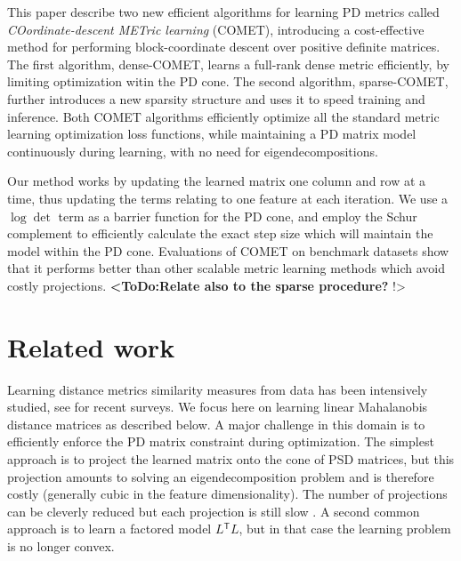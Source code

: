 \documentclass[twoside,11pt]{article}
\newcommand\todo[1]{\textbf{<ToDo:#1}!>}
\newcommand\mat[1]{{#1}}
\newcommand{\T}{{}^\mathsf{T}}
\newcommand{\ignore}[1]{}
\newcommand{\cholL}{\mat{L}}
\begin{document}
This paper describe two new efficient algorithms for learning PD metrics called {\em{COordinate-descent METric learning}} (COMET), introducing a cost-effective method for performing block-coordinate descent over positive definite matrices. The first algorithm, dense-COMET, learns a full-rank dense metric efficiently, by limiting optimization witin the PD cone. The second algorithm, sparse-COMET, further introduces a new sparsity structure and uses it to speed training and inference. Both COMET algorithms  efficiently optimize all the standard metric learning optimization loss functions, while maintaining a PD matrix model continuously during learning, with no need for eigendecompositions. 

Our method works by updating the learned matrix one column and row at a time, thus updating the terms relating to one feature at each iteration. We use a $\log \det$ term as a barrier function for the PD cone, and employ the Schur complement to efficiently calculate the exact step size which will maintain the model within the PD cone. Evaluations of COMET on benchmark datasets show that it performs better than other scalable metric learning methods which avoid costly projections. \todo{Relate also to the sparse procedure? }

\ignore{Furthermore an important challenge for metric learning is the case where the set of features is not fixed in advance, but changes with time. This is a typical scenario in many real life applications of learning: as more data accumulates, it is possible to estimate more parameters accurately, so more features and signals are gradually added to existing systems. It is therefore desirable to develop algorithms that can learn metrics in face of a growing feature set. Our method naturally adapts to this setting, by optimizing the metric matrix one column-row at a time.}

\section{Related work}
Learning distance metrics similarity measures from data has been intensively studied, see \citet{bellet2013survey, kulis2012survey} for recent surveys. We focus here on learning linear Mahalanobis distance matrices as described below. A major challenge in this domain is to efficiently enforce the PD matrix constraint during optimization. The simplest approach is to project the learned matrix onto the cone of PSD matrices, but this projection amounts to solving an eigendecomposition problem and is therefore costly (generally cubic in the feature dimensionality). The number of projections can be cleverly reduced but each projection is still slow \citep{qianHD, qian}. A second common approach is to learn a factored model $\cholL\T \cholL$, but in that case the learning problem is no longer convex. 
\end{document}
